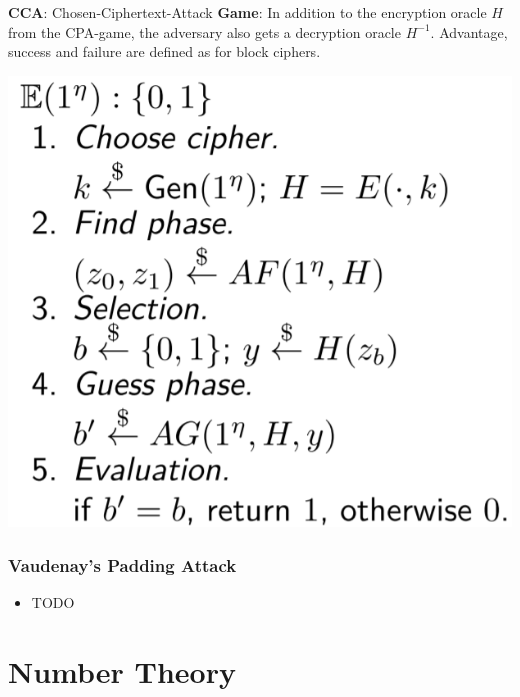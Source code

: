 \begin{minipage}{.62\linewidth}

\textbf{CCA}: Chosen-Ciphertext-Attack \newline\newline \textbf{Game}:
In addition to the encryption oracle \(H\) from the CPA-game, the
adversary also gets a decryption oracle \(H^{-1}\). \newline\newline
Advantage, success and failure are defined as for block ciphers.

\end{minipage}\hfill
\begin{minipage}{.35\linewidth}
    \includegraphics[width=\linewidth]{img/cpa}
\end{minipage}

\hypertarget{vaudenays-padding-attack}{%
\subsubsection{Vaudenay's Padding
Attack}\label{vaudenays-padding-attack}}

\begin{itemize}
\tightlist
\item
  TODO
\end{itemize}

\hypertarget{number-theory}{%
\section{Number Theory}\label{number-theory}}

